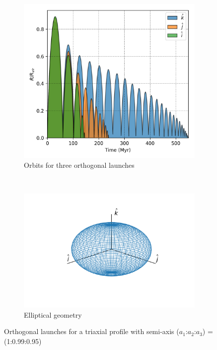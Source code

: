 	\begin{figure}[h]
		\centering
		\begin{subfigure}[b]{0.49\textwidth}
			\includegraphics[width = \textwidth]{"../Files/Week 7/orthogonal_triaxial"}
			\caption{Orbits for three orthogonal launches}
			\label{fig: orthogonalLaunches}
		\end{subfigure}
		~ 
		\begin{subfigure}[b]{0.49\textwidth}
			\includegraphics[width=\textwidth]{"../Files/Week 7/ellipsoid"}
			\caption{Elliptical geometry}
		\end{subfigure}
		\caption{Orthogonal launches for a triaxial profile with semi-axis ($a_1$:$a_2$:$a_3$) = (1:0.99:0.95)}
		\label{fig: mainOrthogonalLaunches}
	\end{figure}

